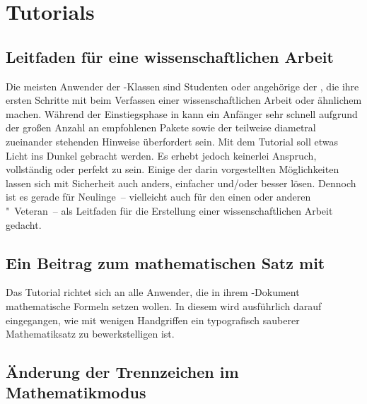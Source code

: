 \chapter{%
  Tutorials%
  \label{sec:tut}%
}
\section{%
  Leitfaden für eine wissenschaftlichen Arbeit%
}

Die meisten Anwender der \TUDScript-Klassen sind Studenten oder angehörige der 
\TnUD, die ihre ersten Schritte mit  beim Verfassen einer 
wissenschaftlichen Arbeit oder ähnlichem machen. Während der Einstiegsphase in 
 kann ein Anfänger sehr schnell aufgrund der großen Anzahl an 
empfohlenen Pakete sowie der teilweise diametral zueinander stehenden Hinweise 
überfordert sein. Mit dem Tutorial  soll etwas 
Licht ins Dunkel gebracht werden. Es erhebt jedoch keinerlei Anspruch, 
vollständig oder perfekt zu sein. Einige der darin vorgestellten Möglichkeiten 
lassen sich mit Sicherheit auch anders, einfacher und/oder besser lösen. 
Dennoch ist es gerade für Neulinge~-- vielleicht auch für den einen oder 
anderen "~Veteran~-- als Leitfaden für die Erstellung einer 
wissenschaftlichen Arbeit gedacht.



\section{%
  Ein Beitrag zum mathematischen Satz mit %
}

Das Tutorial  richtet sich an alle Anwender, die in 
ihrem -Dokument mathematische Formeln setzen wollen. In diesem 
wird ausführlich darauf eingegangen, wie mit wenigen Handgriffen ein 
typografisch sauberer Mathematiksatz zu bewerkstelligen ist.



\section{%
  Änderung der Trennzeichen im Mathematikmodus%
}

